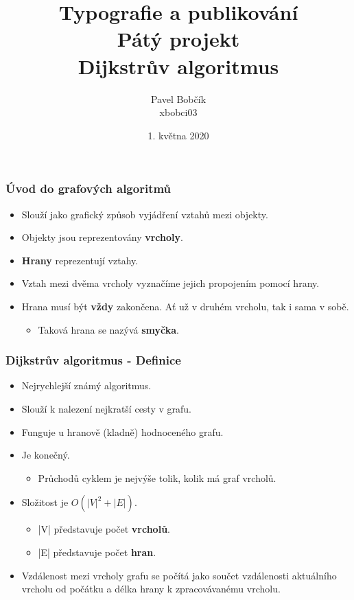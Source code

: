 \documentclass{beamer}
\title{
    Typografie a publikování\\
    \medskip
    Pátý projekt\\
    \bigskip
    \small{Dijkstrův algoritmus}
}
\author{
    Pavel Bobčík\\
    \small{xbobci03}
}
\date{1. května 2020}
\begin{document}
\maketitle
\begin{frame}
    \frametitle{Úvod do grafových algoritmů}
    \begin{itemize}[<+->]
        \item Slouží jako grafický způsob vyjádření vztahů mezi objekty.
        \item Objekty jsou reprezentovány \textbf{vrcholy}.
        \item \textbf{Hrany} reprezentují vztahy.
        \item Vztah mezi dvěma vrcholy vyznačíme jejich propojením pomocí hrany.
        \item Hrana musí být \textbf{vždy} zakončena. Ať už v druhém vrcholu, tak i sama v sobě.
        \begin{itemize}
            \item Taková hrana se nazývá \textbf{smyčka}.
        \end{itemize}
    \end{itemize}
\end{frame}

\begin{frame}
    \frametitle{Dijkstrův algoritmus - Definice}
    \begin{itemize}[<+->]
        \item Nejrychlejší známý algoritmus.
        \item Slouží k nalezení nejkratší cesty v grafu.
        \item Funguje u hranově (kladně) hodnoceného grafu.
        \item Je konečný. 
        \begin{itemize}
            \item Průchodů cyklem je nejvýše tolik, kolik má graf vrcholů.
        \end{itemize}
        \item Složitost je $O(|V|^2 + |E|)$.
        \begin{itemize}
            \item |V| představuje počet \textbf{vrcholů}.
            \item |E| představuje počet \textbf{hran}.
        \end{itemize}
        \item Vzdálenost mezi vrcholy grafu se počítá jako součet vzdálenosti aktuálního vrcholu od počátku a délka hrany k zpracovávanému vrcholu.
    \end{itemize}
\end{frame}
\end{document}
